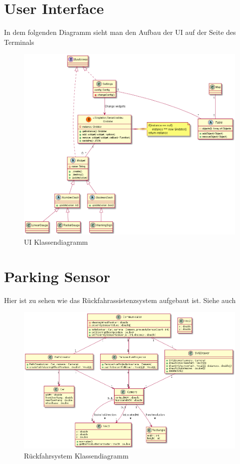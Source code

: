 \documentclass[entwurf.tex]{subfiles}
\begin{document}
  	
  	
  	\newpage
  	\section{User Interface}
		In dem folgenden Diagramm sieht man den Aufbau der UI auf der Seite des Terminals
		\begin{figure}[H]
  			\begin{center}
 				\includegraphics[width=\textwidth]{diagrams/UI.png}
  				\caption{UI Klassendiagramm}
  			\end{center}
  		\end{figure}
  		
  		
  		
  	\newpage
  	\section{Parking Sensor}
		Hier ist zu sehen wie das Rückfahrassistenzsystem aufgebaut ist. Siehe auch %
		\begin{figure}[H]
  			\begin{center}
 				\includegraphics[width=\textwidth]{diagrams/ParkingSensor/class_diagram.png}
  				\caption{Rückfahrsystem Klassendiagramm}
  			\end{center}
  		\end{figure}
  	
  	
\end{document}
